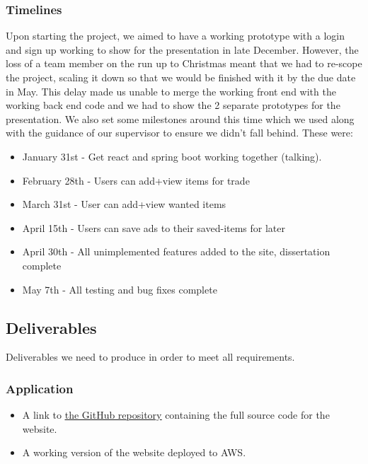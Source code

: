 \subsubsection{Timelines}
Upon starting the project, we aimed to have a working prototype with a login and sign up working to show for the presentation in late December. However, the loss of a team member on the run up to Christmas meant that we had to re-scope the project, scaling it down so that we would be finished with it by the due date in May. This delay made us unable to merge the working front end with the working back end code and we had to show the 2 separate prototypes for the presentation.
We also set some milestones around this time which we used along with the guidance of our supervisor to ensure we didn't fall behind. These were:
\begin{itemize}
    \item January 31st - Get react and spring boot working together (talking).

    \item February 28th - Users can add+view items for trade

    \item March 31st - User can add+view wanted items

    \item April 15th - Users can save ads to their saved-items for later
    
    \item April 30th - All unimplemented features added to the site, dissertation complete
    
    \item May 7th - All testing and bug fixes complete
\end{itemize}

\subsection{Deliverables}
 Deliverables we need to produce in order to meet all requirements. 
 
\subsubsection{Application}
\begin{itemize}
\item A link to \underline{\href{https://github.com/CathalDonohoe/FinalYearProject}{the GitHub repository}} containing the full source code for the website.
\item A working version of the website deployed to AWS.
\end{itemize}

